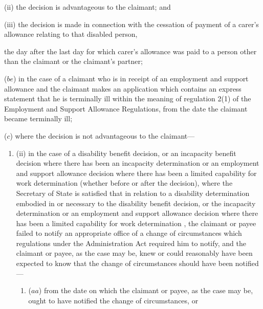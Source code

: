 \documentclass[12pt,a4paper]{article}
\begin{document}
\begin{enumerate}
\begin{enumerate}
(ii) the decision is advantageous to the claimant; and

(iii) the decision is made in connection with the cessation of payment of a carer’s allowance relating to that disabled person,
\end{enumerate}
the day after the last day for which carer’s allowance was paid to a person other than the claimant or the claimant’s partner;


($be$) in the case of a claimant who is in receipt of an employment and support allowance and the claimant makes an application which contains an express statement that he is terminally ill within the meaning of regulation 2(1) of the Employment and Support Allowance Regulations, from the date the claimant became terminally ill;

($c$) where the decision is not advantageous to the claimant—
\begin{enumerate}\item[]


(ii) in the case of a disability benefit decision, or an incapacity benefit decision where there has been an incapacity determination 
or an employment and support allowance decision where there has been a limited capability for work determination  %
(whether before or after the decision), where the Secretary of State is satisfied that in relation to a disability determination embodied in or necessary to the disability benefit decision, or the incapacity determination
or an employment and support allowance decision where there has been a limited capability for work determination%
, the claimant or payee failed to notify an appropriate office of a change of circumstances which regulations under the Administration Act required him to notify, and the claimant or payee, as the case may be, knew or could reasonably have been expected to know that the change of circumstances should have been notified---
\begin{enumerate}\item[]
($aa$) from the date on which the claimant or payee, as the case may be, ought to have notified the change of circumstances, or


\end{enumerate}
\end{enumerate}
\end{enumerate}
\end{document}
